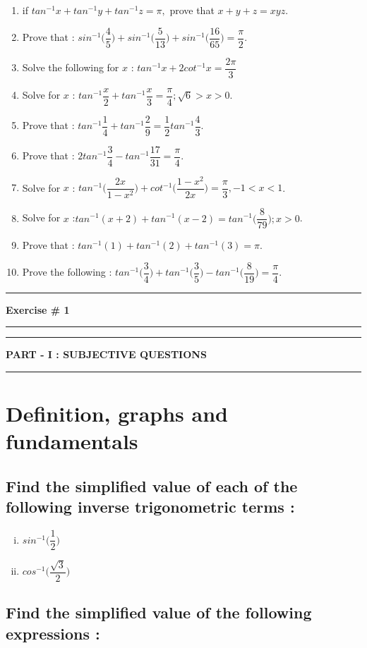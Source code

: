 \documentclass[a4paper,10pt]{article}
\newcommand{\exercise}[1]{\begin{center}\hrule \vspace{5mm}\Huge
{\textbf{#1}} \vspace{5mm} \hrule \end{center}}
\newcommand{\questiontype}[1]{\begin{center}\hrule \vspace{2mm}
\Large{\textbf{#1}}\vspace{2mm}\hrule \end{center}}
\begin{document}
\begin{enumerate}[Type (I):]
\begin{enumerate}[1.]
\item if $tan^{-1}x+tan^{-1}y+tan^{-1}z=\pi,$ prove that $x+y+z=xyz$.
\vspace{5mm}
\item Prove that :
$sin^{-1}\bigg(\dfrac{4}{5}\bigg)+sin^{-1}\bigg(\dfrac{5}{13}\bigg)+sin^{-1}\bigg(\dfrac{16}{65}\bigg)=\dfrac{\pi}{2}$.
\vspace{5mm}
\item Solve the following for $x$ : $tan^{-1}x+2 cot^{-1}x=\dfrac{2\pi}{3}$
\vspace{5mm}
\item Solve for $x$ :
$tan^{-1}\dfrac{x}{2}+tan^{-1}\dfrac{x}{3}=\dfrac{\pi}{4};\sqrt{6}>x>0$.
\vspace{5mm}
\item Prove that :
$tan^{-1}\dfrac{1}{4}+tan^{-1}\dfrac{2}{9}=\dfrac{1}{2}tan^{-1}\dfrac{4}{3}$.
\vspace{5mm}
\item Prove that :
$2tan^{-1}\dfrac{3}{4}-tan^{-1}\dfrac{17}{31}=\dfrac{\pi}{4}$.
\vspace{5mm} 
\item Solve for $x$ :
$tan^{-1}\bigg(\dfrac{2x}{1-x^2}\bigg)+cot^{-1}\bigg(\dfrac{1-x^2}{2x}\bigg)=\dfrac{\pi}{3},-1<x<1$.
\vspace{5mm} 
\item Solve for $x$
:$tan^{-1}(x+2)+tan^{-1}(x-2)=tan^{-1}\bigg(\dfrac{8}{79}\bigg) ; x>0$.
\vspace{5mm} 
\item Prove that : $tan^{-1}(1)+tan^{-1}(2)+tan^{-1}(3)=\pi$.
\vspace{5mm} 
\item Prove the following :
$tan^{-1}\bigg(\dfrac{3}{4}\bigg)+tan^{-1}\bigg(\dfrac{3}{5}\bigg)-tan^{-1}\bigg(\dfrac{8}{19}\bigg)=\dfrac{\pi}{4}$.
\end{enumerate}
\end{enumerate}
\exercise{Exercise \# 1}
\questiontype{PART - I : SUBJECTIVE QUESTIONS}

\section{Definition, graphs and fundamentals}
\subsection{Find the simplified value of each of the following inverse
trigonometric terms :}
\vspace{5mm} 
\begin{enumerate}[(i)]
\item $sin^{-1}\bigg(\dfrac{1}{2}\bigg)$
\item $cos^{-1}\bigg(\dfrac{\sqrt{3}}{2}\bigg)$
\end{enumerate}
\subsection{Find the simplified value of the following expressions :}
\end{document}

